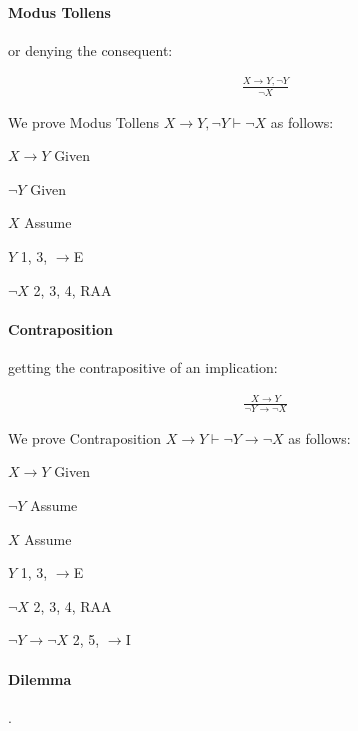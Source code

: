 \documentclass{article}
\newcommand{\indentitem}{\addtolength\itemindent{20pt}}
\theoremstyle{plain}
\theoremstyle{definition}
\begin{document}
\begin{multicols}{2}
\paragraph{Modus Tollens} or denying the consequent:

\begin{align*}
 &\frac{X \rightarrow Y, \lnot Y}{\lnot X}
\end{align*}  

\noindent We prove Modus Tollens $X \rightarrow Y, \lnot Y \vdash \lnot X$ as follows:

\begin{enumerate}
\item $X \rightarrow Y$ \hfill Given
\item $\lnot Y$ \hfill Given
{\indentitem
\item $X$ \hfill Assume
\item $Y$ \hfill 1, 3, $\rightarrow$E
}
\item $\lnot X$ \hfill 2, 3, 4, RAA
\end{enumerate}

\paragraph{Contraposition} getting the contrapositive of an implication:

\begin{align*}
 &\frac{X \rightarrow Y}{\lnot Y \rightarrow \lnot X}
\end{align*}  

\noindent We prove Contraposition $X \rightarrow Y \vdash \lnot Y \rightarrow \lnot X$ as follows:

\begin{enumerate}
\item $X \rightarrow Y$ \hfill Given
{\indentitem
\item $\lnot Y$ \hfill Assume
{\indentitem
\item $X$ \hfill Assume
\item $Y$ \hfill 1, 3, $\rightarrow$E
}
\item $\lnot X$ \hfill 2, 3, 4, RAA
}
\item $\lnot Y \rightarrow \lnot X$ \hfill 2, 5, $\rightarrow$I
\end{enumerate}

\paragraph{Dilemma} .


\end{multicols}
\end{document}
